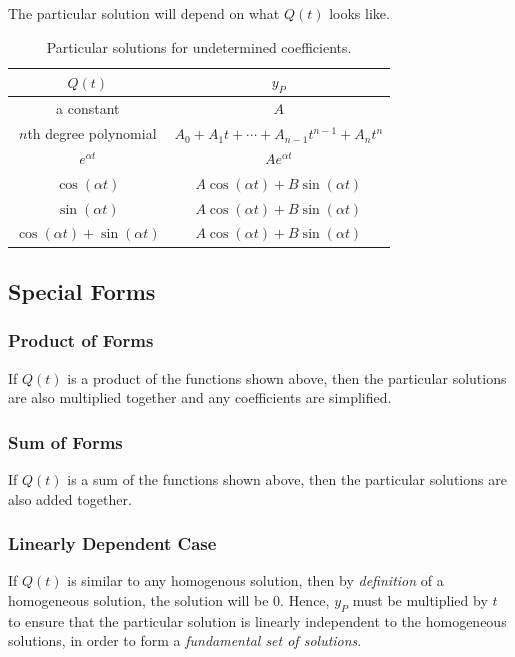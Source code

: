 \documentclass{article}
\begin{document}
The particular solution will depend on what \(Q(t)\) looks like.
\begin{table}[H]
    \centering
    \begin{tabular}{c c}
        \toprule
        \(Q(t)\)                                                          & \(y_P\)                                                             \\
        \midrule
        a constant                                                        & \(A\)                                                               \\
        \(n\)th degree polynomial                                         & \(A_0 + A_1t + \cdots + A_{n-1}t^{n-1} + A_n t^n\)                  \\
        \(e^{\alpha t}\)                                                  & \(Ae^{\alpha t}\)                                                   \\
        \(\cos{\left( \alpha t \right)}\)                                 & \(A\cos{\left( \alpha t \right)} + B\sin{\left( \alpha t \right)}\) \\
        \(\sin{\left( \alpha t \right)}\)                                 & \(A\cos{\left( \alpha t \right)} + B\sin{\left( \alpha t \right)}\) \\
        \(\cos{\left( \alpha t \right)} + \sin{\left( \alpha t \right)}\) & \(A\cos{\left( \alpha t \right)} + B\sin{\left( \alpha t \right)}\) \\
        \bottomrule
    \end{tabular}
    \caption{Particular solutions for undetermined coefficients.}
\end{table}
\subsection{Special Forms}
\subsubsection{Product of Forms}
If \(Q(t)\) is a product of the functions shown above, then the
particular solutions are also multiplied together and any coefficients are simplified.
\subsubsection{Sum of Forms}
If \(Q(t)\) is a sum of the functions shown above, then the
particular solutions are also added together.
\subsubsection{Linearly Dependent Case}
If \(Q(t)\) is similar to any homogenous solution, then by \textit{definition} of
a homogeneous solution, the solution will be \(0\). Hence, \(y_P\) must be multiplied by \(t\)
to ensure that the particular solution is linearly independent to the homogeneous solutions,
in order to form a \textit{fundamental set of solutions}.
\end{document}
